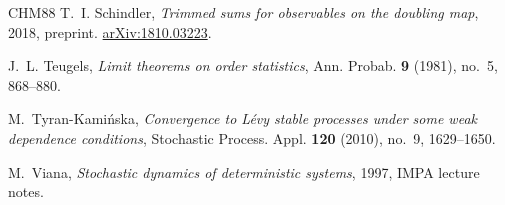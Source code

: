 \documentclass[11pt,twoside,a4paper,reqno]{amsart}
\begin{document}
\begin{thebibliography}{CHM88}
T.~I. Schindler, \emph{Trimmed sums for observables on the doubling map}, 2018, preprint.
\href{https://arxiv.org/abs/1810.03223}{arXiv:1810.03223}.


J.~L. Teugels, \emph{Limit theorems on order statistics}, Ann. Probab.
  \textbf{9} (1981), no.~5, 868--880.

M.~Tyran-Kami\'{n}ska, \emph{Convergence to L\'{e}vy stable processes under some weak dependence conditions}, Stochastic Process. Appl. \textbf{120} (2010), no.~9, 1629--1650.



M.~Viana, \emph{Stochastic dynamics of deterministic systems}, 1997,
IMPA lecture notes.

\end{thebibliography}
\end{document}
